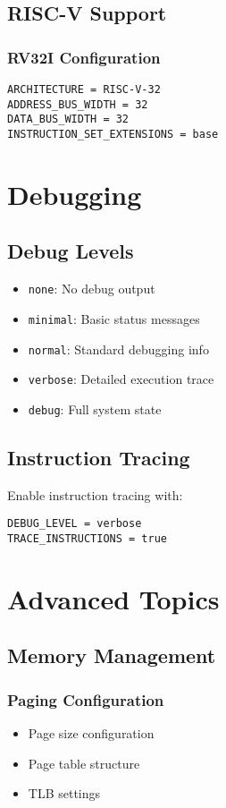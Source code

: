 \documentclass[a4paper,11pt]{book}
\begin{document}
\section{RISC-V Support}
\subsection{RV32I Configuration}
\begin{lstlisting}[style=fxmlstyle]
ARCHITECTURE = RISC-V-32
ADDRESS_BUS_WIDTH = 32
DATA_BUS_WIDTH = 32
INSTRUCTION_SET_EXTENSIONS = base
\end{lstlisting}

\chapter{Debugging}
\section{Debug Levels}
\begin{itemize}
    \item \texttt{none}: No debug output
    \item \texttt{minimal}: Basic status messages
    \item \texttt{normal}: Standard debugging info
    \item \texttt{verbose}: Detailed execution trace
    \item \texttt{debug}: Full system state
\end{itemize}

\section{Instruction Tracing}
Enable instruction tracing with:
\begin{lstlisting}[style=fxmlstyle]
DEBUG_LEVEL = verbose
TRACE_INSTRUCTIONS = true
\end{lstlisting}

\chapter{Advanced Topics}
\section{Memory Management}
\subsection{Paging Configuration}
\begin{itemize}
    \item Page size configuration
    \item Page table structure
    \item TLB settings
\end{itemize}
\end{document}
